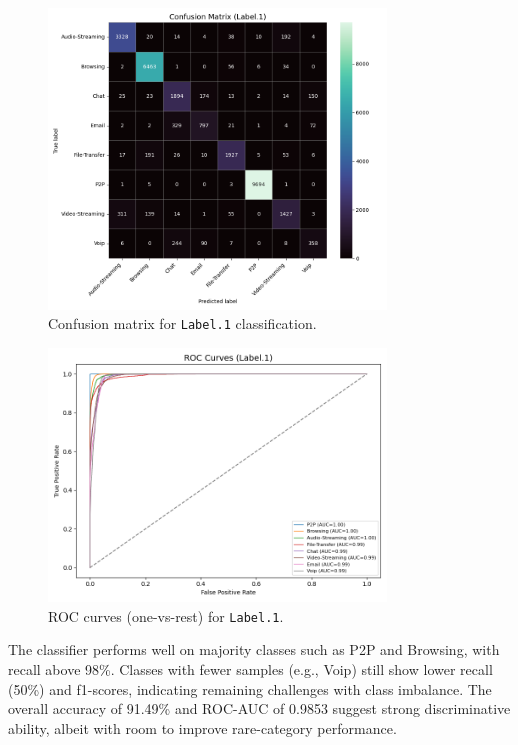 \documentclass[12pt]{article}
\begin{document}
\begin{figure}[H]
  \centering
  \includegraphics[width=0.8\textwidth]{images/cm_Label.1.png}
  \caption{Confusion matrix for \texttt{Label.1} classification.}
  \label{fig:cm_label1}
\end{figure}

\begin{figure}[H]
  \centering
  \includegraphics[width=0.8\textwidth]{images/roc_Label.1.png}
  \caption{ROC curves (one-vs-rest) for \texttt{Label.1}.}
  \label{fig:roc_label1}
\end{figure}
The classifier performs well on majority classes such as P2P and Browsing, with recall above 98\%. Classes with fewer samples (e.g., Voip) still show lower recall (50\%) and f1-scores, indicating remaining challenges with class imbalance. The overall accuracy of 91.49\% and ROC-AUC of 0.9853 suggest strong discriminative ability, albeit with room to improve rare-category performance.
\end{document}

